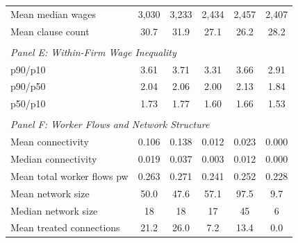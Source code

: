 \begin{table}[H]
\begin{threeparttable}
\begin{tabular}{lccccc}
Mean median wages & 3,030 & 3,233 & 2,434 & 2,457 & 2,407 \\
Mean clause count & 30.7 & 31.9 & 27.1 & 26.2 & 28.2 \\
&&&&& \\
\multicolumn{6}{l}{\textit{Panel E: Within-Firm Wage Inequality}} \\[0.5ex]
p90/p10 & 3.61 & 3.71 & 3.31 & 3.66 & 2.91 \\
p90/p50 & 2.04 & 2.06 & 2.00 & 2.13 & 1.84 \\
p50/p10 & 1.73 & 1.77 & 1.60 & 1.66 & 1.53 \\
&&&&& \\
\multicolumn{6}{l}{\textit{Panel F: Worker Flows and Network Structure}} \\[0.5ex]
Mean connectivity & 0.106 & 0.138 & 0.012 & 0.023 & 0.000 \\
Median connectivity & 0.019 & 0.037 & 0.003 & 0.012 & 0.000 \\
Mean total worker flows pw & 0.263 & 0.271 & 0.241 & 0.252 & 0.228 \\
Mean network size & 50.0 & 47.6 & 57.1 & 97.5 & 9.7 \\
Median network size & 18 & 18 & 17 & 45 & 6 \\
Mean treated connections & 21.2 & 26.0 & 7.2 & 13.4 & 0.0 \\
\bottomrule
\end{tabular}
\scriptsize
\begin{tablenotes}

\end{tablenotes}
\end{threeparttable}
\end{table}
